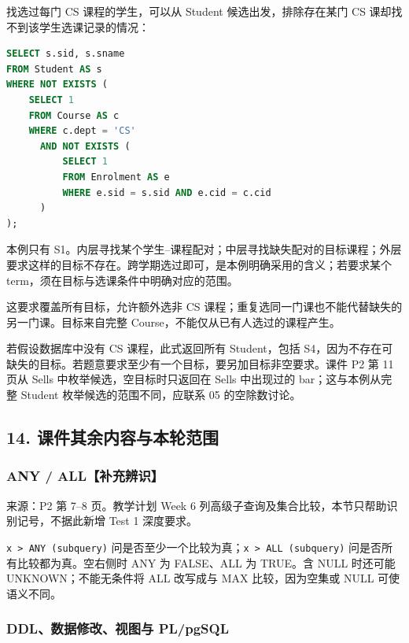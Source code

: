 找选过每门 CS 课程的学生，可以从 Student 候选出发，排除存在某门 CS 课却找不到该学生选课记录的情况：

\Needspace{210pt}
\begin{lstlisting}[language=SQL]
SELECT s.sid, s.sname
FROM Student AS s
WHERE NOT EXISTS (
    SELECT 1
    FROM Course AS c
    WHERE c.dept = 'CS'
      AND NOT EXISTS (
          SELECT 1
          FROM Enrolment AS e
          WHERE e.sid = s.sid AND e.cid = c.cid
      )
);
\end{lstlisting}

本例只有 S1。内层寻找某个学生--课程配对；中层寻找缺失配对的目标课程；外层要求这样的目标不存在。跨学期选过即可，是本例明确采用的含义；若要求某个 term，须在目标与选课条件中明确对应的范围。

这要求覆盖所有目标，允许额外选非 CS 课程；重复选同一门课也不能代替缺失的另一门课。目标来自完整 Course，不能仅从已有人选过的课程产生。

若假设数据库中没有 CS 课程，此式返回所有 Student，包括 S4，因为不存在可缺失的目标。若题意要求至少有一个目标，要另加目标非空要求。课件 P2 第 11 页从 Sells 中枚举候选，空目标时只返回在 Sells 中出现过的 bar；这与本例从完整 Student 枚举候选的范围不同，应联系 05 的空除数讨论。

\subsection{14. 课件其余内容与本轮范围}\label{06_sql_queries_zh-ux8bfeux4ef6ux5176ux4f59ux5185ux5bb9ux4e0eux672cux8f6eux8303ux56f4}

\subsubsection{ANY / ALL【补充辨识】}\label{06_sql_queries_zh-any-allux8865ux5145ux8fa8ux8bc6}

来源：P2 第 7--8 页。教学计划 Week 6 列高级子查询及集合比较，本节只帮助识别记号，不据此新增 Test 1 深度要求。

\texttt{x\ \textgreater{}\ ANY\ (subquery)} 问是否至少一个比较为真；\texttt{x\ \textgreater{}\ ALL\ (subquery)} 问是否所有比较都为真。空右侧时 ANY 为 FALSE、ALL 为 TRUE。含 NULL 时还可能 UNKNOWN；不能无条件将 ALL 改写成与 MAX 比较，因为空集或 NULL 可使语义不同。

\subsubsection{DDL、数据修改、视图与 PL/pgSQL}\label{06_sql_queries_zh-ddlux6570ux636eux4feeux6539ux89c6ux56feux4e0e-plpgsql}

